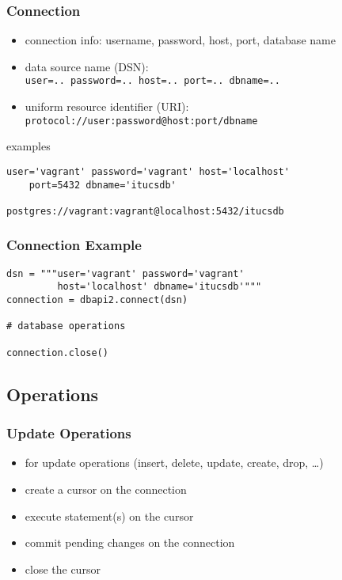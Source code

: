\documentclass[dvipsnames]{beamer}
\theoremstyle{plain}
\begin{document}
\begin{frame}[fragile]
  \frametitle{Connection}

  \begin{itemize}
    \item connection info: username, password, host, port, database name

    \medskip
    \item data source name (DSN):\\
      \texttt{user=.. password=.. host=.. port=.. dbname=..}
    \item uniform resource identifier (URI):\\
      \texttt{protocol://user:password@host:port/dbname}
  \end{itemize}

  \medskip
  \begin{exampleblock}{examples}
    \begin{lstlisting}
user='vagrant' password='vagrant' host='localhost'
    port=5432 dbname='itucsdb'

postgres://vagrant:vagrant@localhost:5432/itucsdb
    \end{lstlisting}
  \end{exampleblock}
\end{frame}

\begin{frame}[fragile]
  \frametitle{Connection Example}

  \begin{lstlisting}
dsn = """user='vagrant' password='vagrant'
         host='localhost' dbname='itucsdb'"""
connection = dbapi2.connect(dsn)

# database operations

connection.close()
  \end{lstlisting}
\end{frame}

\subsection{Operations}

\begin{frame}
  \frametitle{Update Operations}

  \begin{itemize}
    \item for update operations (insert, delete, update, create, drop, \ldots)

    \bigskip
    \item create a cursor on the connection
    \item execute statement(s) on the cursor
    \item commit pending changes on the connection
    \item close the cursor
  \end{itemize}
\end{frame}
\end{document}
